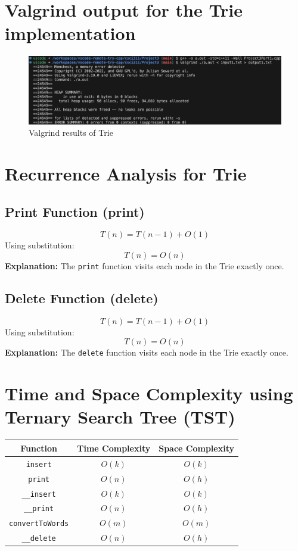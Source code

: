 \documentclass{rapport}
\begin{document}
\section{Valgrind output for the Trie implementation}
\begin{figure}[H]
    \centering
    \includegraphics[width=1\textwidth]{v1.png}
    \caption{Valgrind results of Trie}
    \label{fig:trie_valgrind}
\end{figure}

\section{Recurrence Analysis for Trie}
\subsection{Print Function (print)}
\[
T(n) = T(n - 1) + O(1)
\]
Using substitution:
\[
T(n) = O(n)
\]
\textbf{Explanation:} The \texttt{print} function visits each node in the Trie exactly once.

\subsection{Delete Function (delete)}
\[
T(n) = T(n - 1) + O(1)
\]
Using substitution:
\[
T(n) = O(n)
\]
\textbf{Explanation:} The \texttt{delete} function visits each node in the Trie exactly once.



\section{Time and Space Complexity using Ternary Search Tree (TST)}

\begin{center}
\begin{tabular}{|c|c|c|}
\hline
\textbf{Function} & \textbf{Time Complexity} & \textbf{Space Complexity} \\
\hline
\texttt{insert} & \(O(k)\) & \(O(k)\) \\
\hline
\texttt{print} & \(O(n)\) & \(O(h)\) \\
\hline
\texttt{\_\_insert} & \(O(k)\) & \(O(k)\) \\
\hline
\texttt{\_\_print} & \(O(n)\) & \(O(h)\) \\
\hline
\texttt{convertToWords} & \(O(m)\) & \(O(m)\) \\
\hline
\texttt{\_\_delete} & \(O(n)\) & \(O(h)\) \\
\hline
\end{tabular}
\end{center}
\end{document}
